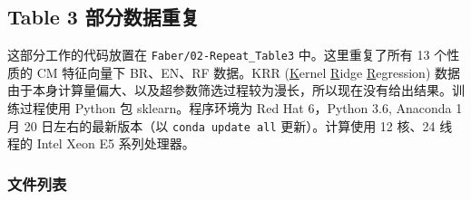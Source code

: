 \documentclass[10pt,a4paper,onecolumn]{article}
\numberwithin{equation}{section}
\begin{document}
\subsection{Table 3 部分数据重复}

这部分工作的代码放置在 \verb|Faber/02-Repeat_Table3| 中。这里重复了所有 13 个性质的 CM 特征向量下 BR、EN、RF 数据。KRR (\underline Kernel \underline Ridge \underline Regression) 数据由于本身计算量偏大、以及超参数筛选过程较为漫长，所以现在没有给出结果。训练过程使用 Python 包 sklearn。程序环境为 Red Hat 6，Python 3.6, Anaconda 1 月 20 日左右的最新版本（以 \verb|conda update all| 更新）。计算使用 12 核、24 线程的 Intel Xeon E5 系列处理器。

\subsubsection{文件列表}
\end{document}
